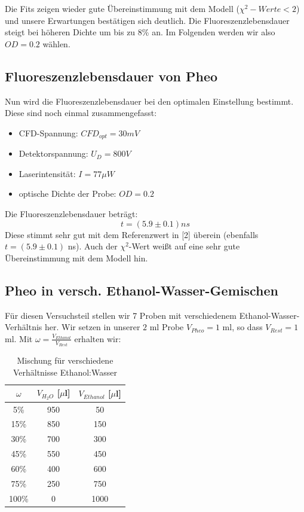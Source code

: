 \documentclass{article}
\begin{document}
Die Fits zeigen wieder gute Übereinstimmung mit dem Modell ($\chi^2-Werte <2$) und unsere Erwartungen bestätigen sich deutlich.
Die Fluoreszenzlebensdauer steigt bei höheren Dichte um bis zu 8\% an. Im Folgenden werden wir also $OD = 0.2$ wählen.




\subsection{Fluoreszenzlebensdauer von Pheo}
Nun wird die Fluoreszenzlebensdauer bei den optimalen Einstellung bestimmt. Diese sind noch einmal zusammengefasst:

\begin{itemize}
  \item CFD-Spannung: $CFD_{opt}=30mV$
  \item Detektorspannung: $U_D=800V$
  \item Laserintensität: $I=77\mu W$
  \item optische Dichte der Probe: $OD=0.2$
\end{itemize}

\noindent Die Fluoreszenzlebensdauer beträgt: $$t=(5.9 \pm 0.1)ns$$
Diese stimmt sehr gut mit dem Referenzwert in [2] überein (ebenfalls $t=(5.9 \pm 0.1)$ ns). Auch der $\chi^2$-Wert weißt auf
eine sehr gute Übereinstimmung mit dem Modell hin.



\subsection{Pheo in versch. Ethanol-Wasser-Gemischen}
Für diesen Versuchsteil stellen wir 7 Proben mit verschiedenem Ethanol-Wasser-Verhältnis her.
Wir setzen in unserer $2$ ml Probe $V_{Pheo}=1$ ml, so dass $V_{Rest}=1$ ml. Mit $\omega= \frac{V_{Ethanol}}{V_{Rest}}$ erhalten wir:

\begin{table}[h]
  \centering
  \begin{tabular}{c|c|c}
    $\omega$ & $V_{H_2O}$ [$\mu$l] & $V_{Ethanol}$ [$\mu$l] \\
    \hline
     5\%     & 950                 & 50                      \\
     15\%    & 850                 & 150                    \\
     30\%    & 700                 & 300                    \\
     45\%    & 550                 & 450                    \\
     60\%    & 400                 & 600                    \\
     75\%    & 250                 & 750                    \\
     100\%   & 0                   & 1000                   \\

  \end{tabular}
  \caption{Mischung für verschiedene Verhältnisse Ethanol:Wasser}
\end{table}
\end{document}
